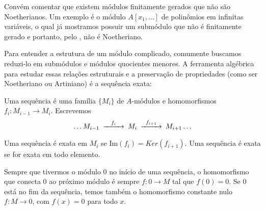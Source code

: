 Convém comentar que existem módulos finitamente gerados que não são Noetherianos. Um exemplo é o módulo $A[x_{1}, \dots]$ de polinômios em infinitas variáveis, o qual já mostramos possuir um submódulo que não é finitamente gerado e portanto, pelo , não é Noetheriano.

Para entender a estrutura de um módulo complicado, comumente buscamos reduzi-lo em submódulos e módulos quocientes menores. A ferramenta algébrica para estudar essas relações estruturais e a preservação de propriedades (como ser Noetheriano ou Artiniano) é a sequência exata:
\begin{definition}
	\label{loc:def_8_:_sequências_exatas.definição}
	Uma sequência é uma família $\{ M_{i} \}$ de $A$-módulos e homomorfismos $f_{i}:M_{i-1}\to M_{i}$. Escrevemos
	\begin{equation*}
		\begin{CD}
			\dots M_{i-1} @>{f_{i}}>>M_{i} @>{f_{i+1}}>> M_{i+1}\dots
		\end{CD}
	\end{equation*}

	Uma sequência é exata em $M_{i}$ se $\mathrm{Im}(f_{i})=Ker(f_{i+1})$. Uma sequência é exata se for exata em todo elemento.

	Sempre que tivermos o módulo $0$ no início de uma sequência, o homomorfismo que conecta $0$ ao próximo módulo é sempre $f:0 \to M$ tal que $f(0)=0$. Se $0$ está no fim da sequência, temos também o homomorfismo constante nulo $f:M\to 0$, com $f(x)=0$ para todo $x$.
\end{definition}
